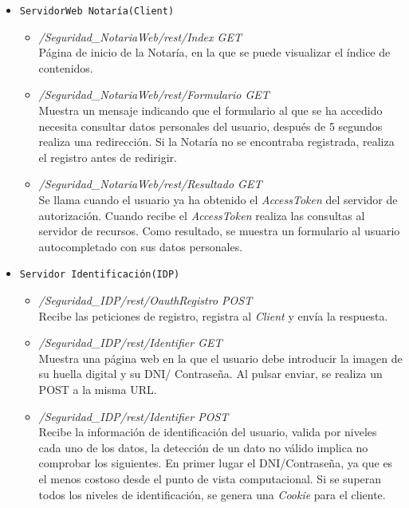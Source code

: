 \documentclass[a4,12pt,onecolum]{article}
\begin{document}
\begin{itemize}
\item \texttt{ServidorWeb Notaría(Client)}
	\begin{itemize}
		\item \emph{/Seguridad\_NotariaWeb/rest/Index	GET} \\
		Página de inicio de la Notaría, en la que se puede visualizar el índice de contenidos.
		
		\item \emph{/Seguridad\_NotariaWeb/rest/Formulario	GET} \\
		Muestra un mensaje indicando que el formulario al que se ha accedido necesita consultar datos 					personales del usuario, después de 5 segundos realiza una redirección. Si la Notaría no se encontraba 			registrada, realiza el registro antes de redirigir.
		
		\item \emph{/Seguridad\_NotariaWeb/rest/Resultado	GET} \\
		Se llama cuando el usuario ya ha obtenido el \emph{AccessToken} del servidor de autorización. Cuando 			recibe el \emph{AccessToken} realiza las consultas al servidor de recursos. Como resultado, se muestra 			un formulario al usuario autocompletado con sus datos personales.
	\end{itemize}
	
\item \texttt{Servidor Identificación(IDP)}
	\begin{itemize}
		\item \emph{/Seguridad\_IDP/rest/OauthRegistro	POST} \\
		Recibe las peticiones de registro, registra al \emph{Client} y envía la respuesta.
		
		\item \emph{/Seguridad\_IDP/rest/Identifier	GET} \\
		Muestra una página web en la que el usuario debe introducir la imagen de su huella digital y su DNI/			Contraseña. Al pulsar enviar, se realiza un POST a la misma URL.
		
		\item \emph{/Seguridad\_IDP/rest/Identifier	POST} \\
		Recibe la información de identificación del usuario, valida por niveles cada uno de los datos, la 				detección de un dato no válido implica no comprobar los siguientes. En primer lugar el DNI/Contraseña, 			ya que es el menos costoso desde el punto de vista computacional.
		Si se superan todos los niveles de identificación, se genera una \emph{Cookie} para el cliente.
		

\end{itemize}
\end{itemize}
\end{document}
